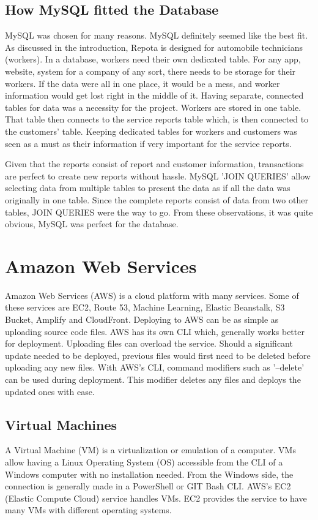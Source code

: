 \subsection{How MySQL fitted the Database}
MySQL was chosen for many reasons. MySQL definitely seemed like the best fit. As discussed in the introduction, Repota is designed for automobile technicians (workers). In a database, workers need their own dedicated table. For any app, website, system for a company of any sort, there needs to be storage for their workers. If the data were all in one place, it would be a mess, and worker information would get lost right in the middle of it. Having separate, connected tables for data was a necessity for the project. Workers are stored in one table. That table then connects to the service reports table which, is then connected to the customers' table. Keeping dedicated tables for workers and customers was seen as a must as their information if very important for the service reports.

Given that the reports consist of report and customer information, transactions are perfect to create new reports without hassle. MySQL 'JOIN QUERIES' allow selecting data from multiple tables to present the data as if all the data was originally in one table. Since the complete reports consist of data from two other tables, JOIN QUERIES were the way to go. From these observations, it was quite obvious, MySQL was perfect for the database. 

\section{Amazon Web Services}
Amazon Web Services (AWS) is a cloud platform with many services. Some of these services are EC2, Route 53, Machine Learning, Elastic Beanstalk, S3 Bucket, Amplify and CloudFront. Deploying to AWS can be as simple as uploading source code files. AWS has its own CLI which, generally works better for deployment. Uploading files can overload the service. Should a significant update needed to be deployed, previous files would first need to be deleted before uploading any new files. With AWS's CLI, command modifiers such as '--delete' can be used during deployment. This modifier deletes any files and deploys the updated ones with ease.

\subsection{Virtual Machines}
A Virtual Machine (VM) is a virtualization or emulation of a computer. VMs allow having a Linux Operating System (OS) accessible from the CLI of a Windows computer with no installation needed. From the Windows side, the connection is generally made in a PowerShell or GIT Bash CLI. AWS's EC2 (Elastic Compute Cloud) service handles VMs. EC2 provides the service to have many VMs with different operating systems.

